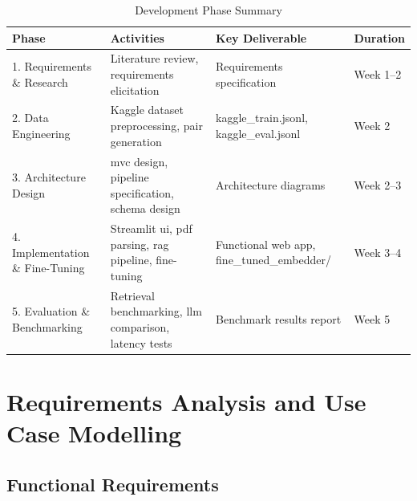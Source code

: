 \begin{table}[H]

\centering

\caption{Development Phase Summary}

\label{tab:phases}

\begin{tabular}{|p{3.5cm}|p{4cm}|p{3.5cm}|p{2cm}|}

\hline

\textbf{Phase} & \textbf{Activities} & \textbf{Key Deliverable} & \textbf{Duration} \\

\hline

1. Requirements \& Research & Literature review, requirements elicitation & Requirements specification & Week 1–2 \\

\hline

2. Data Engineering & Kaggle dataset preprocessing, pair generation & kaggle\_train.jsonl, kaggle\_eval.jsonl & Week 2 \\

\hline

3. Architecture Design & \gls{mvc} design, pipeline specification, schema design & Architecture diagrams & Week 2–3 \\

\hline

4. Implementation \& Fine-Tuning & Streamlit \gls{ui}, \gls{pdf} parsing, \gls{rag} pipeline, fine-tuning & Functional web app, fine\_tuned\_embedder/ & Week 3–4 \\

\hline

5. Evaluation \& Benchmarking & Retrieval benchmarking, \gls{llm} comparison, latency tests & Benchmark results report & Week 5 \\

\hline

\end{tabular}

\end{table}

\section{Requirements Analysis and Use Case Modelling}

\subsection{Functional Requirements}

